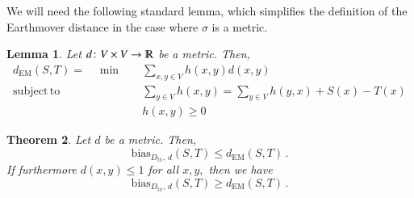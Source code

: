 \documentclass[letterpaper,11pt]{article}
\newtheorem{theorem}{Theorem}[section]
\newtheorem{lemma}[theorem]{Lemma}%
\theoremstyle{definition}
\renewcommand{\mathbb}{\varmathbb}
\newcommand{\mper}{\,.}
\newcommand{\R}{\mathbb{R}}
\newcommand{\tv}{\mathrm{tv}}
\newcommand\bias{\mathrm{bias}}
\newcommand\EM{\mathrm{EM}}
\newcommand\dtoDtv{D_\tv,\, d}
\begin{document}
We will need the following standard lemma, which simplifies the definition of
the Earthmover distance in the case where $\sigma$ is a metric.
%
\begin{lemma}\label{lem:em-metric}
Let $d\colon V\times V\to\R$ be a metric. Then,
\begin{align*}
d_\EM(S,T)=\quad\min\quad & \sum_{x,y\in V} h(x,y)d(x,y)\\
\mathrm{subject\, to}\quad
& \sum_{y\in V} h(x,y) = \sum_{y\in V}
h(y,x)+S(x)-T(x)\\
& h(x,y)\ge 0
\end{align*}
\end{lemma}
%
\begin{theorem}\label{thm:em-tv}
Let $d$ be a metric. Then,
\begin{equation}\label{eq:tv2em}
\bias_{\dtoDtv}(S,T)\le d_{\EM}(S,T)\mper
\end{equation}
If furthermore $d(x,y)\le1$ for all $x,y,$ then we have
\begin{equation}\label{eq:em2tv}
\bias_{\dtoDtv}(S,T)\ge d_{\EM}(S,T)\mper
\end{equation}
\end{theorem}
%
\end{document}
